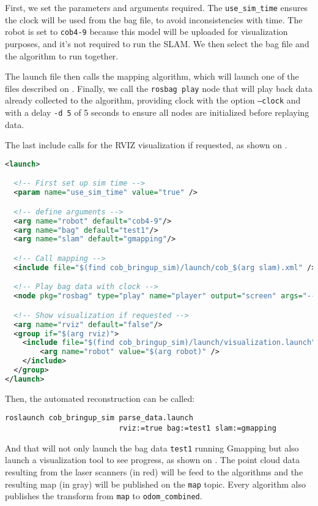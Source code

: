 First, we set the parameters and arguments required. The \texttt{use\_sim\_time} ensures the clock will be used from the bag file, to avoid inconsistencies with time. The robot is set to \texttt{cob4-9} because this model will be uploaded for visualization purposes, and it's not required to run the SLAM. We then select the bag file and the algorithm to run together.

The launch file then calls the mapping algorithm, which will launch one of the files described on . Finally, we call the \texttt{rosbag play} node that will play back data already collected to the algorithm, providing clock with the option \texttt{--clock} and with a delay \texttt{-d 5} of 5 seconds to ensure all nodes are initialized before replaying data.

The last include calls for the RVIZ visualization if requested, as shown on .

\begin{lstlisting}[caption={Automated data parser.},label={lst:parser},language=XML]
<launch>

  <!-- First set up sim time -->
  <param name="use_sim_time" value="true" />

  <!-- define arguments -->
  <arg name="robot" default="cob4-9"/>
  <arg name="bag" default="test1"/>
  <arg name="slam" default="gmapping"/>

  <!-- Call mapping -->
  <include file="$(find cob_bringup_sim)/launch/cob_$(arg slam).xml" />

  <!-- Play bag data with clock -->
  <node pkg="rosbag" type="play" name="player" output="screen" args="--clock -q -d 5 $(find cob_bringup_sim)/bags/$(arg bag).bag"/>

  <!-- Show visualization if requested -->
  <arg name="rviz" default="false"/>
  <group if="$(arg rviz)">
    <include file="$(find cob_bringup_sim)/launch/visualization.launch" >
        <arg name="robot" value="$(arg robot)" />
    </include>
  </group>
</launch>
\end{lstlisting}

Then, the automated reconstruction can be called:

\begin{verbatim}
roslaunch cob_bringup_sim parse_data.launch
                          rviz:=true bag:=test1 slam:=gmapping
\end{verbatim}

And that will not only launch the bag data \texttt{test1} running Gmapping but also launch a visualization tool to see progress, as shown on . The point cloud data resulting from the laser scanners (in red) will be feed to the algorithms and the resulting map (in gray) will be published on the \texttt{map} topic. Every algorithm also publishes the transform from \texttt{map} to \texttt{odom\_combined}.

